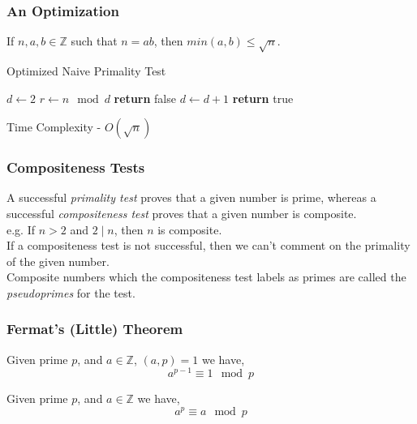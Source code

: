 \documentclass{beamer}
\begin{document}
\begin{frame}
\frametitle{An Optimization}

If $n,a,b \in \mathbb{Z}$ such that $n = ab$, then $min(a,b) \leq \sqrt n$.

\begin{algorithm}[H]
\caption{Optimized Naive Primality Test}
\label{alg:OptimizedNaivePrimalityTest}
\begin{algorithmic}
\State $d\gets 2$
\State $r\gets n \mod d$
	\State \textbf{return} false 
\EndIf
\State $d \gets d+1$
\EndWhile
\State \textbf{return} true 
\EndProcedure
\end{algorithmic}
\end{algorithm}

Time Complexity - $O(\sqrt n)$
\end{frame}

\begin{frame}
\frametitle{Compositeness Tests}

A successful \emph{primality test} proves that a given number is prime, whereas a successful \emph{compositeness test} proves that a given number is composite. 
\\[3mm]
e.g. If $n > 2$ and $2 \mid n$, then $n$ is composite.
\\[3mm]
If a compositeness test is not successful, then we can't comment on the primality of the given number.
\\[3mm]
Composite numbers which the compositeness test labels as primes are called the \emph{pseudoprimes} for the test.

\end{frame}

\begin{frame}
\frametitle{Fermat's (Little) Theorem}

\begin{theorem}
\label{theorem:FermatLittleTheorem}
Given prime $p$, and $a \in \mathbb{Z}$, $(a,p) = 1$ we have,
\[ a^{p-1} \equiv 1 \mod p \]
\end{theorem}

\begin{corollary}[1]
\label{corollary:BetterFermatLittleTheorem}
Given prime $p$, and $a \in \mathbb{Z}$ we have,
\[ a^p \equiv a \mod p \]
\end{corollary}

\end{frame}
\end{document}
